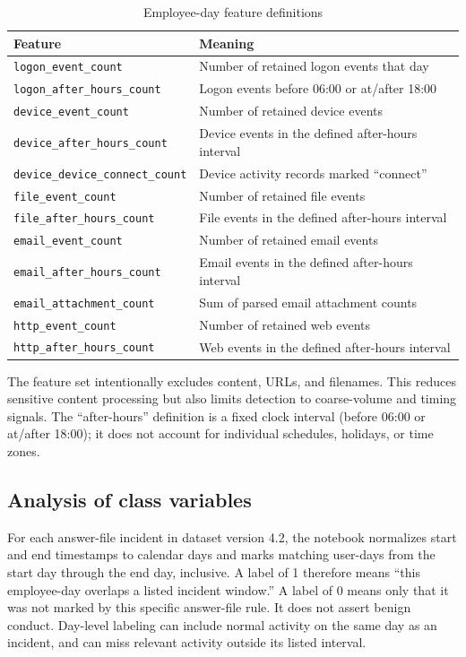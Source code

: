 \documentclass[12pt,a4paper,oneside]{report}
\begin{document}
\begin{table}[!htbp]
\centering
\caption{Employee-day feature definitions}
\label{tab:features}
\begin{tabularx}{\textwidth}{|p{}|X|}
\hline
Feature & Meaning\\
\hline
\texttt{logon\_event\_count} & Number of retained logon events that day\\
\hline
\texttt{logon\_after\_hours\_count} & Logon events before 06:00 or at/after 18:00\\
\hline
\texttt{device\_event\_count} & Number of retained device events\\
\hline
\texttt{device\_after\_hours\_count} & Device events in the defined after-hours interval\\
\hline
\texttt{device\_device\_connect\_count} & Device activity records marked ``connect''\\
\hline
\texttt{file\_event\_count} & Number of retained file events\\
\hline
\texttt{file\_after\_hours\_count} & File events in the defined after-hours interval\\
\hline
\texttt{email\_event\_count} & Number of retained email events\\
\hline
\texttt{email\_after\_hours\_count} & Email events in the defined after-hours interval\\
\hline
\texttt{email\_attachment\_count} & Sum of parsed email attachment counts\\
\hline
\texttt{http\_event\_count} & Number of retained web events\\
\hline
\texttt{http\_after\_hours\_count} & Web events in the defined after-hours interval\\
\hline
\end{tabularx}
\end{table}

The feature set intentionally excludes content, URLs, and filenames. This
reduces sensitive content processing but also limits detection to
coarse-volume and timing signals. The ``after-hours'' definition is a
fixed clock interval (before 06:00 or at/after 18:00); it does not
account for individual schedules, holidays, or time zones.

\subsection{Analysis of class variables}
For each answer-file incident in dataset version 4.2, the notebook
normalizes start and end timestamps to calendar days and marks matching
user-days from the start day through the end day, inclusive. A label of
1 therefore means ``this employee-day overlaps a listed incident
window.'' A label of 0 means only that it was not marked by this
specific answer-file rule. It does not assert benign conduct. Day-level
labeling can include normal activity on the same day as an incident,
and can miss relevant activity outside its listed interval.
\end{document}
